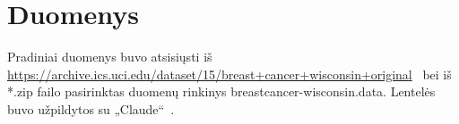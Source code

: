 \section{Duomenys}
\label{sec:Duomenys}

Pradiniai duomenys buvo atsisiųsti iš \url{https://archive.ics.uci.edu/dataset/15/breast+cancer+wisconsin+original}~\cite{breast_cancer_wisconsin_original_15} bei iš *.zip failo pasirinktas duomenų rinkinys breastcancer-wisconsin.data. Lentelės buvo užpildytos su „Claude“~\cite{claude_bendrai}.


